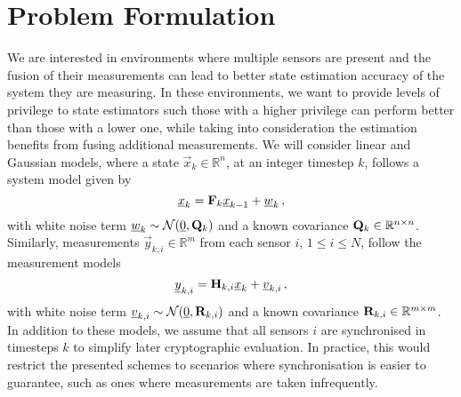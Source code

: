 \documentclass[conference]{IEEEtran}
\theoremstyle{definition}
\theoremstyle{remark}
\begin{document}
% 
%                                              
%                                              
%                                              
% 

\section{Problem Formulation}\label{sec:prob}
We are interested in environments where multiple sensors are present and the fusion of their measurements can lead to better state estimation accuracy of the system they are measuring. In these environments, we want to provide levels of privilege to state estimators such those with a higher privilege can perform better than those with a lower one, while taking into consideration the estimation benefits from fusing additional measurements. We will consider linear and Gaussian models, where a state $\vec{x}_k \in \mathbb{R}^n$, at an integer timestep $k$, follows a system model given by
\begin{equation}\label{eqn:system_model}
  \vec{x}_k = \mat{F}_k \vec{x}_{k-1} + \vec{w}_k\,,
\end{equation}
with white noise term ${\underline{w}}_k \sim \mathcal{N}({\underline{0}},{{\mathbf{Q}}}_k)$ and a known covariance ${{\mathbf{Q}}}_k \in \mathbb{R}^{n \times n}$. Similarly, measurements $\vec{y}_{k,i} \in \mathbb{R}^m$ from each sensor $i$, $1\leq i\leq N$, follow the measurement models
\begin{equation}\label{eqn:measurement_models}
  \vec{y}_{k,i} = \mat{H}_{k,i} \vec{x}_k + \vec{v}_{k,i}\,,
\end{equation}
with white noise term ${\underline{v}}_{k,i} \sim \mathcal{N}({\underline{0}},{{\mathbf{R}}}_{k,i})$ and a known covariance ${{\mathbf{R}}}_{k,i} \in \mathbb{R}^{m \times m}$. In addition to these models, we assume that all sensors $i$ are synchronised in timesteps $k$ to simplify later cryptographic evaluation. In practice, this would restrict the presented schemes to scenarios where synchronisation is easier to guarantee, such as ones where measurements are taken infrequently.
\end{document}
